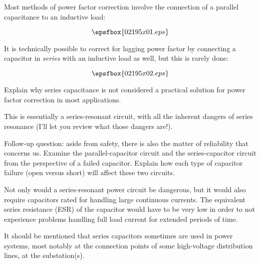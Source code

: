 

Most methods of power factor correction involve the connection of a parallel capacitance to an inductive load:

$$\epsfbox{02195x01.eps}$$

It is technically possible to correct for lagging power factor by connecting a capacitor in {\it series} with an inductive load as well, but this is rarely done:

$$\epsfbox{02195x02.eps}$$

Explain why series capacitance is not considered a practical solution for power factor correction in most applications.







This is essentially a series-resonant circuit, with all the inherent dangers of series resonance (I'll let you review what those dangers are!).

\vskip 10pt

Follow-up question: aside from safety, there is also the matter of reliability that concerns us.  Examine the parallel-capacitor circuit and the series-capacitor circuit from the perspective of a failed capacitor.  Explain how each type of capacitor failure (open versus short) will affect these two circuits.







Not only would a series-resonant power circuit be dangerous, but it would also require capacitors rated for handling large continuous currents.  The equivalent series resistance (ESR) of the capacitor would have to be very low in order to not experience problems handling full load current for extended periods of time.

It should be mentioned that series capacitors sometimes are used in power systems, most notably at the connection points of some high-voltage distribution lines, at the substation(s).




